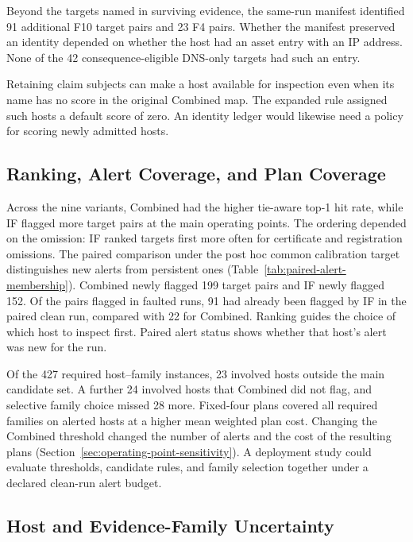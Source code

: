 \documentclass[sn-basic]{sn-jnl}%
\theoremstyle{thmstyleone}%
\theoremstyle{thmstyletwo}%
\theoremstyle{thmstylethree}%
\begin{document}
Beyond the targets named in surviving evidence, the same-run manifest identified 91 additional F10 target pairs and 23 F4 pairs. Whether the manifest preserved an identity depended on whether the host had an asset entry with an IP address. None of the 42 consequence-eligible DNS-only targets had such an entry.

Retaining claim subjects can make a host available for inspection even when its name has no score in the original Combined map. The expanded rule assigned such hosts a default score of zero. An identity ledger would likewise need a policy for scoring newly admitted hosts.

\subsection{Ranking, Alert Coverage, and Plan Coverage}
\label{sec:ranking-alert-plan-coverage}

Across the nine variants, Combined had the higher tie-aware top-1 hit rate, while IF flagged more target pairs at the main operating points. The ordering depended on the omission: IF ranked targets first more often for certificate and registration omissions. The paired comparison under the post hoc common calibration target distinguishes new alerts from persistent ones (Table~\ref{tab:paired-alert-membership}). Combined newly flagged 199 target pairs and IF newly flagged 152. Of the pairs flagged in faulted runs, 91 had already been flagged by IF in the paired clean run, compared with 22 for Combined. Ranking guides the choice of which host to inspect first. Paired alert status shows whether that host's alert was new for the run.

Of the 427 required host--family instances, 23 involved hosts outside the main candidate set. A further 24 involved hosts that Combined did not flag, and selective family choice missed 28 more. Fixed-four plans covered all required families on alerted hosts at a higher mean weighted plan cost. Changing the Combined threshold changed the number of alerts and the cost of the resulting plans (Section~\ref{sec:operating-point-sensitivity}). A deployment study could evaluate thresholds, candidate rules, and family selection together under a declared clean-run alert budget.

\subsection{Host and Evidence-Family Uncertainty}
\label{sec:host-family-uncertainty}
\end{document}
